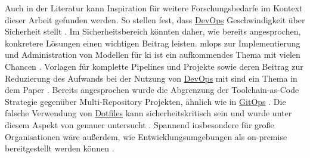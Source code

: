 Auch in der Literatur kann Inspiration für weitere Forschungsbedarfe im Kontext dieser Arbeit gefunden werden. So stellen \citeauthor{000:CI-CD-Deployment-in-DevOps-reduce-Gap-Developer-Operation} fest, dass \hyperref[sec:03-01_devops]{DevOps} Geschwindigkeit über Sicherheit stellt \cite{010:Efficient-Application-Deployment-GitOps-for-Faster-and-Secure-CI-CD-Cycles}. Im Sicherheitsbereich könnten daher, wie bereits angesprochen, konkretere Lösungen einen wichtigen Beitrag leisten. \Gls{mlops} zur Implementierung und Administration von Modellen für \Gls{ki} ist ein aufkommendes Thema mit vielen Chancen \cite{010:Efficient-Application-Deployment-GitOps-for-Faster-and-Secure-CI-CD-Cycles}. Vorlagen für komplette Pipelines und Projekte sowie deren Beitrag zur Reduzierung des Aufwands bei der Nutzung von \hyperref[sec:03-01_devops]{DevOps} mit  sind ein Thema in dem Paper  \cite{019:Advanced-DevOps-Environment-for-Microservices-based-Applications}. Bereits angesprochen wurde die Abgrenzung der Toolchain-as-Code Strategie gegenüber Multi-Repository Projekten, ähnlich wie in \hyperref[sec:03-03_gitops]{GitOps} \cite{109:GitOps}. Die falsche Verwendung von \hyperref[sec:03-04_dotfiles]{Dotfiles} kann sicherheitskritisch sein und wurde unter diesem Aspekt von \citeauthor{029:Connecting-the-Dotfiles} genauer untersucht \cite{029:Connecting-the-Dotfiles}. Spannend insbesondere für große Organisationen wäre außerdem, wie Entwicklungsumgebungen als  on-premise bereitgestellt werden können \cite{014:Managing-Container-based-Software-Development-Environments}.
